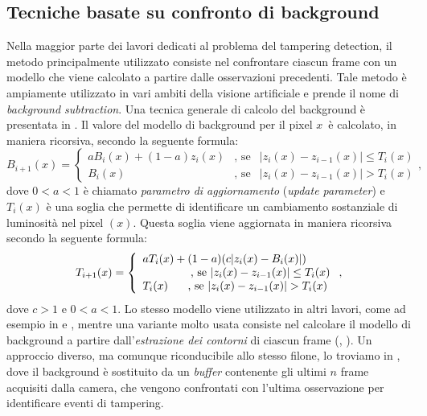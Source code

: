 \subsection{Tecniche basate su confronto di background}
\label{background}
Nella maggior parte dei lavori dedicati al problema del tampering detection, il metodo principalmente utilizzato consiste nel confrontare ciascun frame con un modello che viene calcolato a partire dalle osservazioni precedenti.
Tale metodo \`e ampiamente utilizzato in vari ambiti della visione artificiale e prende il nome di \textit{background subtraction}.
Una tecnica generale di calcolo del background \`e presentata in \cite{aksay2007camera}.
Il valore del modello di background per il pixel $x$\ \`e calcolato, in maniera ricorsiva, secondo la seguente formula:
\[
\label{eq:background}
B_{i + 1}(x)=\left\{ \begin{array} {lcl}
aB_i(x)+ (1-a)z_i(x) & \mbox{, se} & |z_i(x) - z_{i-1}(x)|\leq T_i(x) \\
B_i(x) & \mbox{, se} & |z_i(x) - z_{i-1}(x)|>T_i(x)\end{array} \right. ,
\]
dove $0 < a < 1$ \`e chiamato \textit{parametro di aggiornamento} (\textit{update parameter}) e $T_i(x)$ \`e una soglia che permette di identificare un cambiamento sostanziale di luminosit\`a nel pixel $(x)$. 
 Questa soglia viene aggiornata in maniera ricorsiva secondo la seguente formula:
  \[
  \label{eq:backgroundThreshUpd}
  T_{i + 1}(x)=\left\{ \begin{array} {lcl}
  aT_i(x)+ (1-a)(c |z_i(x) - B_i(x)|) \\
  \mbox{\hspace{1.5cm}, se	}  |z_i(x) - z_{i-1}(x)|\leq T_i(x) \\
  T_i(x) \mbox{	\hspace{0.5cm}, se	}  |z_i(x) - z_{i-1}(x)|>T_i(x) \end{array} \right. ,
  \]
  dove $c > 1$ e $0<a<1$.
  Lo stesso modello viene utilizzato in altri lavori, come ad esempio in \cite{saglam2009real} e \cite{tsesmelis2013tamper}, mentre una variante molto usata consiste nel calcolare il modello di background a partire dall'\textit{estrazione dei contorni} di ciascun frame (\cite{harasse2004automated}, \cite{gil2007automatic}).
  Un approccio diverso, ma comunque riconducibile allo stesso filone, lo troviamo in \cite{ribnick2006real}, dove il background \`e sostituito da un \textit{buffer} contenente gli ultimi $n$ frame acquisiti dalla camera, che vengono confrontati con l'ultima osservazione per identificare eventi di tampering.
